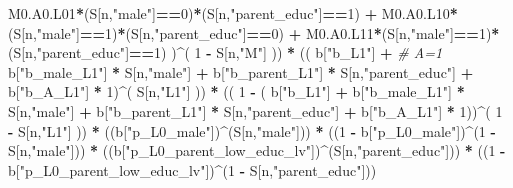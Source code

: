 \documentclass[
]{book}
\newenvironment{Shaded}{\begin{snugshade}}{\end{snugshade}}
\newcommand{\CommentTok}[1]{\textcolor[rgb]{0.56,0.35,0.01}{\textit{#1}}}
\newcommand{\DecValTok}[1]{\textcolor[rgb]{0.00,0.00,0.81}{#1}}
\newcommand{\NormalTok}[1]{#1}
\newcommand{\SpecialCharTok}[1]{\textcolor[rgb]{0.81,0.36,0.00}{\textbf{#1}}}
\newcommand{\StringTok}[1]{\textcolor[rgb]{0.31,0.60,0.02}{#1}}
\begin{document}
\begin{Shaded}
\begin{Highlighting}[]
\NormalTok{          M0.A0.L01}\SpecialCharTok{*}\NormalTok{(S[n,}\StringTok{"male"}\NormalTok{]}\SpecialCharTok{==}\DecValTok{0}\NormalTok{)}\SpecialCharTok{*}\NormalTok{(S[n,}\StringTok{"parent\_educ"}\NormalTok{]}\SpecialCharTok{==}\DecValTok{1}\NormalTok{) }\SpecialCharTok{+}
\NormalTok{          M0.A0.L10}\SpecialCharTok{*}\NormalTok{(S[n,}\StringTok{"male"}\NormalTok{]}\SpecialCharTok{==}\DecValTok{1}\NormalTok{)}\SpecialCharTok{*}\NormalTok{(S[n,}\StringTok{"parent\_educ"}\NormalTok{]}\SpecialCharTok{==}\DecValTok{0}\NormalTok{) }\SpecialCharTok{+} 
\NormalTok{          M0.A0.L11}\SpecialCharTok{*}\NormalTok{(S[n,}\StringTok{"male"}\NormalTok{]}\SpecialCharTok{==}\DecValTok{1}\NormalTok{)}\SpecialCharTok{*}\NormalTok{(S[n,}\StringTok{"parent\_educ"}\NormalTok{]}\SpecialCharTok{==}\DecValTok{1}\NormalTok{) )}\SpecialCharTok{\^{}}\NormalTok{( }\DecValTok{1} \SpecialCharTok{{-}}\NormalTok{ S[n,}\StringTok{"M"}\NormalTok{] )) }\SpecialCharTok{*}
\NormalTok{      (( b[}\StringTok{"b\_L1"}\NormalTok{] }\SpecialCharTok{+}                                                            \CommentTok{\# A=1}
\NormalTok{           b[}\StringTok{"b\_male\_L1"}\NormalTok{] }\SpecialCharTok{*}\NormalTok{ S[n,}\StringTok{"male"}\NormalTok{] }\SpecialCharTok{+}  
\NormalTok{           b[}\StringTok{"b\_parent\_L1"}\NormalTok{] }\SpecialCharTok{*}\NormalTok{ S[n,}\StringTok{"parent\_educ"}\NormalTok{] }\SpecialCharTok{+}
\NormalTok{           b[}\StringTok{"b\_A\_L1"}\NormalTok{] }\SpecialCharTok{*} \DecValTok{1}\NormalTok{)}\SpecialCharTok{\^{}}\NormalTok{( S[n,}\StringTok{"L1"}\NormalTok{] )) }\SpecialCharTok{*}
\NormalTok{      (( }\DecValTok{1} \SpecialCharTok{{-}}\NormalTok{ ( b[}\StringTok{"b\_L1"}\NormalTok{] }\SpecialCharTok{+}
\NormalTok{                 b[}\StringTok{"b\_male\_L1"}\NormalTok{] }\SpecialCharTok{*}\NormalTok{ S[n,}\StringTok{"male"}\NormalTok{] }\SpecialCharTok{+}  
\NormalTok{                 b[}\StringTok{"b\_parent\_L1"}\NormalTok{] }\SpecialCharTok{*}\NormalTok{ S[n,}\StringTok{"parent\_educ"}\NormalTok{] }\SpecialCharTok{+}
\NormalTok{                 b[}\StringTok{"b\_A\_L1"}\NormalTok{] }\SpecialCharTok{*} \DecValTok{1}\NormalTok{))}\SpecialCharTok{\^{}}\NormalTok{( }\DecValTok{1} \SpecialCharTok{{-}}\NormalTok{ S[n,}\StringTok{"L1"}\NormalTok{] )) }\SpecialCharTok{*}
\NormalTok{      ((b[}\StringTok{"p\_L0\_male"}\NormalTok{])}\SpecialCharTok{\^{}}\NormalTok{(S[n,}\StringTok{"male"}\NormalTok{])) }\SpecialCharTok{*} 
\NormalTok{      ((}\DecValTok{1} \SpecialCharTok{{-}}\NormalTok{ b[}\StringTok{"p\_L0\_male"}\NormalTok{])}\SpecialCharTok{\^{}}\NormalTok{(}\DecValTok{1} \SpecialCharTok{{-}}\NormalTok{ S[n,}\StringTok{"male"}\NormalTok{])) }\SpecialCharTok{*} 
\NormalTok{      ((b[}\StringTok{"p\_L0\_parent\_low\_educ\_lv"}\NormalTok{])}\SpecialCharTok{\^{}}\NormalTok{(S[n,}\StringTok{"parent\_educ"}\NormalTok{])) }\SpecialCharTok{*}
\NormalTok{      ((}\DecValTok{1} \SpecialCharTok{{-}}\NormalTok{ b[}\StringTok{"p\_L0\_parent\_low\_educ\_lv"}\NormalTok{])}\SpecialCharTok{\^{}}\NormalTok{(}\DecValTok{1} \SpecialCharTok{{-}}\NormalTok{ S[n,}\StringTok{"parent\_educ"}\NormalTok{])) }
    

\end{Highlighting}
\end{Shaded}
\end{document}
